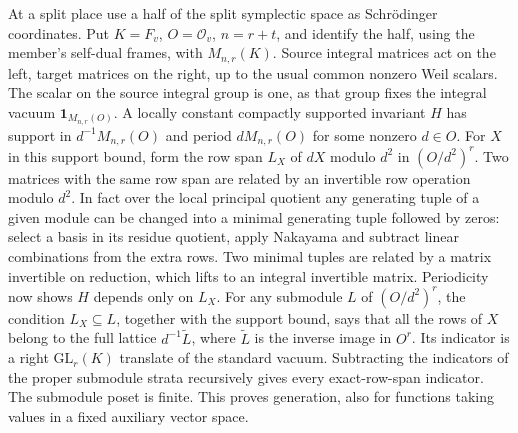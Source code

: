 At a split place use a half of the split symplectic space as
Schr\"odinger coordinates. Put $K=F_v$, $O=\mathcal O_v$, $n=r+t$,
and identify the half, using the member's self-dual frames, with
$M_{n,r}(K)$. Source integral matrices act on the left, target
matrices on the right, up to the usual common nonzero Weil scalars.
The scalar on the source integral group is one, as that group
fixes the integral vacuum $\mathbf1_{M_{n,r}(O)}$. A locally
constant compactly supported invariant $H$ has support in
$d^{-1}M_{n,r}(O)$ and period $dM_{n,r}(O)$ for some nonzero
$d\in O$. For $X$ in this support bound, form the row span
$L_X$ of $dX$ modulo $d^2$ in $(O/d^2)^r$.
Two matrices with the same row span are related by an invertible
row operation modulo $d^2$. In fact over the local principal
quotient any generating tuple of a given module can be changed
into a minimal generating tuple followed by zeros: select a basis
in its residue quotient, apply Nakayama and subtract linear
combinations from the extra rows. Two minimal tuples are related by
a matrix invertible on reduction, which lifts to an integral
invertible matrix. Periodicity now shows $H$ depends only on $L_X$.
For any submodule $L$ of $(O/d^2)^r$, the condition $L_X\subseteq L$,
together with the support bound, says that all the rows of $X$
belong to the full lattice $d^{-1}\widetilde L$, where
$\widetilde L$ is the inverse image in $O^r$. Its indicator
is a right $\mathrm{GL}_r(K)$ translate of the standard vacuum.
Subtracting the indicators of the proper submodule strata
recursively gives every exact-row-span indicator. The submodule
poset is finite. This proves generation, also for functions taking
values in a fixed auxiliary vector space.

